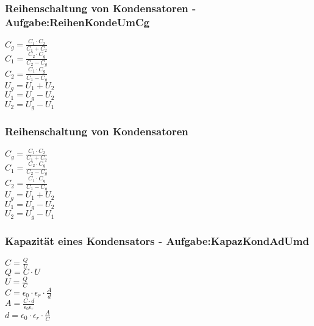 \subsubsection{Reihenschaltung von Kondensatoren - Aufgabe:ReihenKondeUmCg} 
\begin{minipage}{0.45\textwidth} 
$ C_{g}  = \frac{C_{1} \cdot C_{2} }{C_{1} +C_{2} } $\\ 
$ C_{1}  = \frac{C_{2} \cdot C_{g} }{C_{2} -C_{g} } $\\ 
$ C_{2}  = \frac{C_{1} \cdot C_{g} }{C_{1} -C_{g} } $\\ 
$ U_{g}  = U_{1}  + U_{2} $\\ 
$ U_{1}  = U_{g}  - U_{2} $\\ 
$ U_{2}  = U_{g}  - U_{1} $\\ 
\end{minipage} 
\begin{minipage}{0.45\textwidth} 
 
\end{minipage} 
\subsubsection{Reihenschaltung von Kondensatoren} 
\begin{minipage}{0.45\textwidth} 
$ C_{g}  = \frac{C_{1} \cdot C_{2} }{C_{1} +C_{2} } $\\ 
$ C_{1}  = \frac{C_{2} \cdot C_{g} }{C_{2} -C_{g} } $\\ 
$ C_{2}  = \frac{C_{1} \cdot C_{g} }{C_{1} -C_{g} } $\\ 
$ U_{g}  = U_{1}  + U_{2} $\\ 
$ U_{1}  = U_{g}  - U_{2} $\\ 
$ U_{2}  = U_{g}  - U_{1} $\\ 
\end{minipage} 
\begin{minipage}{0.45\textwidth} 
 
\end{minipage} 
\subsubsection{Kapazität eines Kondensators - Aufgabe:KapazKondAdUmd} 
\begin{minipage}{0.45\textwidth} 
$ C = \frac{Q}{U} $\\ 
$ Q = C\cdot U $\\ 
$ U = \frac{Q}{C} $\\ 
$ C = \epsilon _{0} \cdot \epsilon _{r} \cdot \frac{A}{d} $\\ 
$ A = \frac{C\cdot d}{\epsilon _{0} \epsilon _{r} } $\\ 
$ d = \epsilon _{0} \cdot \epsilon _{r} \cdot \frac{A}{C} $\\ 
\end{minipage} 
\begin{minipage}{0.45\textwidth} 
 
\end{minipage} 
